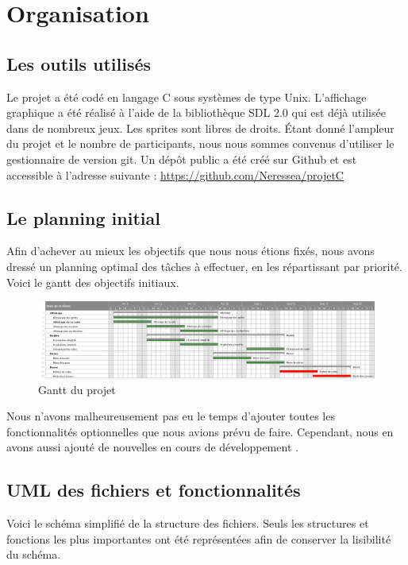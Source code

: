 \section{Organisation}

\subsection{Les outils utilisés}

Le projet a été codé en langage C sous systèmes de type Unix. L’affichage graphique a été réalisé à l’aide de la
bibliothèque SDL 2.0 qui est déjà utilisée dans de nombreux jeux. Les sprites sont libres de droits. Étant donné l’ampleur du projet et le
nombre de participants, nous nous sommes convenus d’utiliser le gestionnaire de version git. Un dépôt public a été créé sur Github et est accessible à l'adresse suivante : \url{https://github.com/Neressea/projetC}

\subsection{Le planning initial}

Afin d'achever au mieux les objectifs que nous nous étions fixés, nous avons dressé un planning optimal des tâches à effectuer, en les répartissant par priorité. Voici le gantt des objectifs initiaux.

\begin{figure}[!ht]
    \includegraphics[width=1.1\textwidth]{./images/gantt.png}
    \caption{Gantt du projet}
\end{figure}

Nous n'avons malheureusement pas eu le temps d'ajouter toutes les fonctionnalités optionnelles que nous avions prévu de faire. Cependant, nous en avons aussi ajouté de nouvelles en cours de développement .

\subsection{UML des fichiers et fonctionnalités}

Voici le schéma simplifié de la structure des fichiers. Seuls les structures et fonctions les plus importantes ont été représentées afin de conserver la lisibilité du schéma. 

